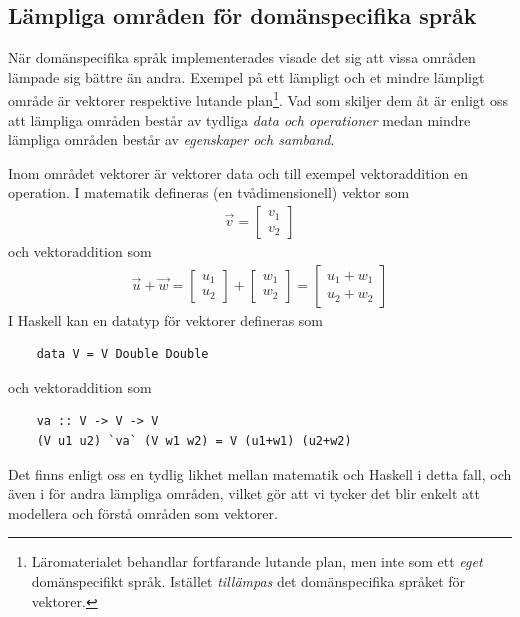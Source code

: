 \subsection{Lämpliga områden för domänspecifika språk}\label{sec:lampligt}

När domänspecifika språk implementerades visade det sig att vissa områden lämpade sig bättre än andra. Exempel på ett lämpligt och et mindre lämpligt område är vektorer respektive lutande plan\footnote{Läromaterialet behandlar fortfarande lutande plan, men inte som ett \textit{eget} domänspecifikt språk. Istället \textit{tillämpas} det domänspecifika språket för vektorer.}. Vad som skiljer dem åt är enligt oss att lämpliga områden består av tydliga \textit{data och operationer} medan mindre lämpliga områden består av \textit{egenskaper och samband}.

Inom området vektorer är vektorer data och till exempel vektoraddition en operation. I matematik defineras (en tvådimensionell) vektor som
\begin{align*}
  \vec{v} = \begin{bmatrix}
              v_1 \\
              v_2
            \end{bmatrix}
\end{align*}
och vektoraddition som
\begin{align*}
  \vec{u} + \vec{w} = \begin{bmatrix}
                        u_1 \\
                        u_2
                      \end{bmatrix}
                    + \begin{bmatrix}
                        w_1 \\
                        w_2
                      \end{bmatrix}
                    = \begin{bmatrix}
                        u_1 + w_1 \\
                        u_2 + w_2
                      \end{bmatrix}
\end{align*}
I Haskell kan en datatyp för vektorer defineras som
\begin{lstlisting}
    data V = V Double Double
\end{lstlisting}
och vektoraddition som
\begin{lstlisting}
    va :: V -> V -> V
    (V u1 u2) `va` (V w1 w2) = V (u1+w1) (u2+w2)
\end{lstlisting}
Det finns enligt oss en tydlig likhet mellan matematik och Haskell i detta fall, och även i för andra lämpliga områden, vilket gör att vi tycker det blir enkelt att modellera och förstå områden som vektorer.

